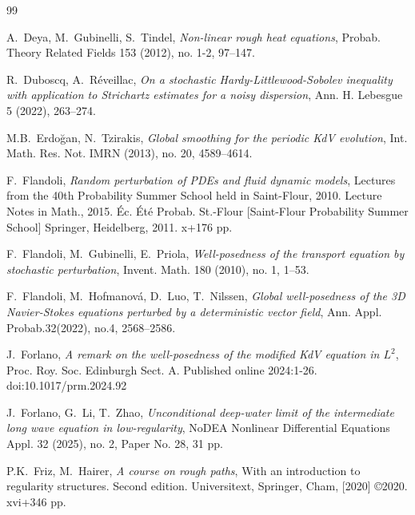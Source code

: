 \documentclass[letterpaper, 11pt,  reqno]{amsart}
\newcommand{\1}{\hspace{0.5mm}\text{I}\hspace{0.5mm}}
\numberwithin{equation}{section}
\numberwithin{theorem}{section}
\begin{document}
\begin{thebibliography}{99}
 
A.~Deya, M.~Gubinelli, S.~Tindel,
{\it Non-linear rough heat equations},
Probab. Theory Related Fields 153 (2012), no. 1-2, 97--147.
 
 

R.~Duboscq, A.~R\'eveillac, 
{\it On a stochastic Hardy-Littlewood-Sobolev inequality with application to Strichartz estimates for a noisy dispersion}, 
Ann. H. Lebesgue 5 (2022), 263--274. 


M.B.~Erdo\u{g}an, N.~Tzirakis, 
{\it Global smoothing for the periodic KdV evolution}, 
Int. Math. Res. Not. IMRN (2013), no. 20, 4589--4614.



F.~Flandoli, 
{\it Random perturbation of PDEs and fluid dynamic models},
 Lectures from the 40th Probability Summer School held in Saint-Flour, 2010. Lecture Notes in Math., 2015. 
 \'Ec. \'Et\'e Probab. St.-Flour [Saint-Flour Probability Summer School] Springer, Heidelberg, 2011. x+176 pp.




F.~Flandoli, M.~Gubinelli, E.~Priola,
{\it Well-posedness of the transport equation by stochastic perturbation},
Invent. Math. 180 (2010), no. 1, 1--53.


F.~Flandoli, M.~Hofmanov\'a, D.~Luo, T.~Nilssen, 
{\it Global well-posedness of the 3D Navier-Stokes equations perturbed by a deterministic vector field}, 
Ann. Appl. Probab.32(2022), no.4, 2568--2586.


J.~Forlano,
{\it A remark on the well-posedness of the modified KdV equation in $L^2$},
Proc. Roy. Soc. Edinburgh Sect. A. Published online 2024:1-26. doi:10.1017/prm.2024.92



J.~Forlano, G.~Li, T.~Zhao,
{\it Unconditional deep-water limit of the intermediate long wave equation in low-regularity},
 NoDEA Nonlinear Differential Equations Appl. 32 (2025), no. 2, Paper No. 28, 31 pp.





P.K.~Friz,  M.~Hairer, 
{\it A course on rough paths}, 
With an introduction to regularity structures. Second edition.
Universitext, Springer, Cham, [2020] \copyright 2020. xvi+346 pp.



%
%


\end{thebibliography}
\end{document}
